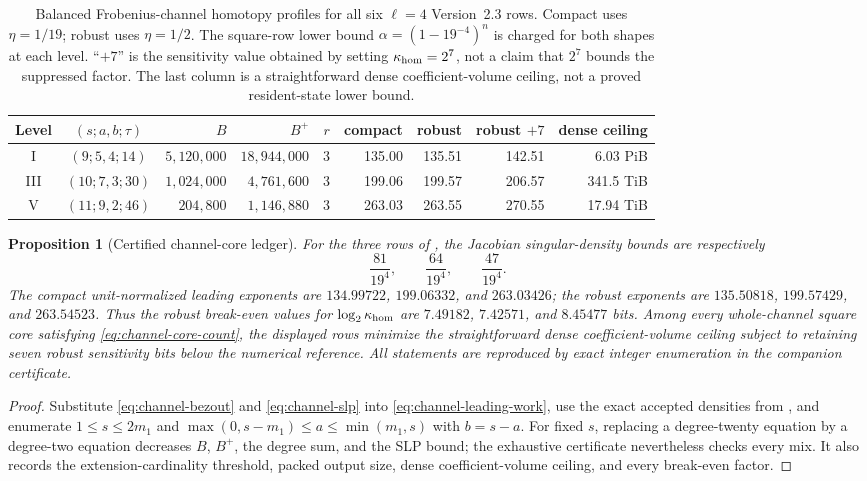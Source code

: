 \documentclass[11pt]{article}
\newtheorem{proposition}[proposition]{Proposition}
\begin{document}
\begin{table}[H]
\centering
\caption{Balanced Frobenius-channel homotopy profiles for all six $\ell=4$
Version~2.3 rows.  Compact uses $\eta=1/19$; robust uses $\eta=1/2$.
The square-row lower bound $\alpha=(1-19^{-4})^n$ is charged for both shapes at
each level.  ``$+7$'' is the sensitivity value obtained by setting
$\kappa_{\rm hom}=2^7$, not a claim that $2^7$ bounds the suppressed factor.
The last column is a straightforward dense coefficient-volume ceiling, not a
proved resident-state lower bound.}
\label{tab:channel-homotopy}
\scriptsize
\setlength{\tabcolsep}{2.8pt}
\begin{tabular}{@{}c c r r c r r r r@{}}
\toprule
Level & $(s;a,b;\tau)$ & $B$ & $B^+$ & $r$ & compact & robust & robust $+7$ & dense ceiling\\
\midrule
I   & $(9;5,4;14)$  & $5{,}120{,}000$ & $18{,}944{,}000$ & 3 & 135.00 & 135.51 & 142.51 & 6.03 PiB\\
III & $(10;7,3;30)$ & $1{,}024{,}000$ & $4{,}761{,}600$  & 3 & 199.06 & 199.57 & 206.57 & 341.5 TiB\\
V   & $(11;9,2;46)$ & $204{,}800$     & $1{,}146{,}880$  & 3 & 263.03 & 263.55 & 270.55 & 17.94 TiB\\
\bottomrule
\end{tabular}
\end{table}

\begin{proposition}[Certified channel-core ledger]
\label{prop:channel-homotopy-ledger}
For the three rows of , the Jacobian singular-density
bounds are respectively
\[
 \frac{81}{19^4},\qquad \frac{64}{19^4},\qquad \frac{47}{19^4}.
\]
The compact unit-normalized leading exponents are
$134.99722$, $199.06332$, and $263.03426$; the robust exponents are
$135.50818$, $199.57429$, and $263.54523$.  Thus the robust break-even values
for $\log_2\kappa_{\rm hom}$ are $7.49182$, $7.42571$, and $8.45477$ bits.
Among every whole-channel square core satisfying \eqref{eq:channel-core-count},
the displayed rows minimize the straightforward dense coefficient-volume
ceiling subject to retaining seven robust sensitivity bits below the numerical
reference.  All statements are reproduced by exact integer enumeration in the
companion certificate.
\end{proposition}

\begin{proof}
Substitute \eqref{eq:channel-bezout} and \eqref{eq:channel-slp} into
\eqref{eq:channel-leading-work}, use the exact accepted densities from
, and enumerate
$1\le s\le2m_1$ and
$\max(0,s-m_1)\le a\le\min(m_1,s)$ with $b=s-a$.  For fixed $s$, replacing a
degree-twenty equation by a degree-two equation decreases $B$, $B^+$, the
degree sum, and the SLP bound; the exhaustive certificate nevertheless checks
every mix.  It also records the extension-cardinality threshold, packed output
size, dense coefficient-volume ceiling, and every break-even factor.
\end{proof}
\end{document}
